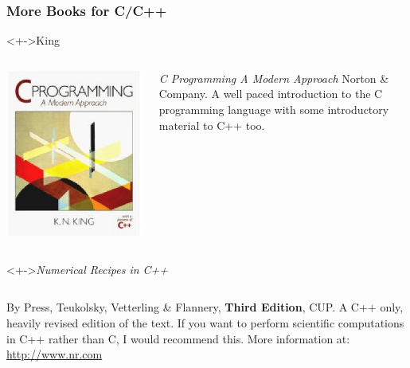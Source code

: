 \documentclass[table]{beamer}
\let\oldurl=\url
\renewcommand{\url}[1]{\textcolor{blue}{\oldurl{#1}}}
\begin{document}
\begin{frame}
\frametitle{More Books for C/C++}
\begin{block}<+->{King}
\begin{columns}
\begin{column}{1.5cm}
\includegraphics[width=\textwidth]{king}
\end{column}
\begin{column}{8cm}
\emph{C Programming A Modern Approach}
Norton \& Company. A well paced introduction to the C programming language with some introductory material to C++ too.
\end{column}
\end{columns}
\end{block}
\begin{block}<+->{\emph{Numerical Recipes in C++}}
\begin{columns}
\begin{column}{8cm}
By Press, Teukolsky, Vetterling \& Flannery, {\bf Third Edition}, CUP.
A C++ only, heavily revised edition of the text. If you want to perform scientific computations in C++ rather than C, I would recommend this. More information at:
\url{http://www.nr.com}
\end{column}
\end{columns}
\end{block}
\end{frame}
\end{document}
